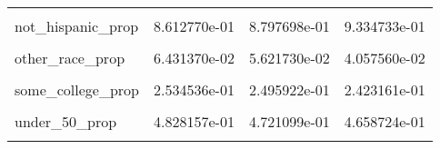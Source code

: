\begin{table}[H]
\begin{tabular}[t]{lrrr}
\cellcolor{gray!6}{not\_employed\_prop} & \cellcolor{gray!6}{2.467043e-01} & \cellcolor{gray!6}{2.675074e-01} & \cellcolor{gray!6}{2.739005e-01}\\
not\_hispanic\_prop & 8.612770e-01 & 8.797698e-01 & 9.334733e-01\\
\cellcolor{gray!6}{not\_married\_prop} & \cellcolor{gray!6}{3.684918e-01} & \cellcolor{gray!6}{3.955927e-01} & \cellcolor{gray!6}{3.728014e-01}\\
other\_race\_prop & 6.431370e-02 & 5.621730e-02 & 4.057560e-02\\
\addlinespace
\cellcolor{gray!6}{over\_50\_prop} & \cellcolor{gray!6}{3.368499e-01} & \cellcolor{gray!6}{3.481782e-01} & \cellcolor{gray!6}{3.596021e-01}\\
some\_college\_prop & 2.534536e-01 & 2.495922e-01 & 2.423161e-01\\
\cellcolor{gray!6}{under\_30\_prop} & \cellcolor{gray!6}{1.803345e-01} & \cellcolor{gray!6}{1.797119e-01} & \cellcolor{gray!6}{1.745255e-01}\\
under\_50\_prop & 4.828157e-01 & 4.721099e-01 & 4.658724e-01\\
\cellcolor{gray!6}{white\_prop} & \cellcolor{gray!6}{8.703941e-01} & \cellcolor{gray!6}{8.367905e-01} & \cellcolor{gray!6}{8.129196e-01}\\
\bottomrule
\end{tabular}
\end{table}
